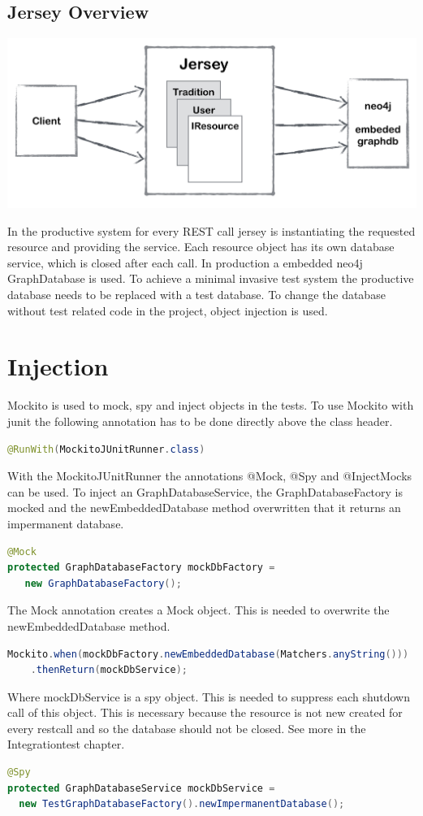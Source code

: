 \documentclass[11pt,fleqn,openany]{book} %
\begin{document}
\section*{Jersey Overview} 

\begin{center}
\includegraphics[scale=.40]{Pictures/jerseyoverview.png} 
\end{center}

In the productive system for every REST call jersey is instantiating the requested resource and providing the service. Each resource object has its own database service, which is closed after each call. In production a embedded neo4j GraphDatabase is used. To achieve a minimal invasive test system the productive database needs to be replaced with a test database. To change the database without test related code in the project, object injection is used. 


\chapter{Injection}
Mockito is used to mock, spy and inject objects in the tests. To use Mockito with junit the following annotation has to be done directly above the class header.
\begin{lstlisting}[language=java]
@RunWith(MockitoJUnitRunner.class)
\end{lstlisting}
With the MockitoJUnitRunner the annotations @Mock, @Spy and @InjectMocks can be used. To inject an GraphDatabaseService, the GraphDatabaseFactory is mocked and the newEmbeddedDatabase method overwritten that it returns an impermanent database. 
\begin{lstlisting}[language=java]
@Mock
protected GraphDatabaseFactory mockDbFactory =
   new GraphDatabaseFactory();
\end{lstlisting}
The Mock annotation creates a Mock object. This is needed to overwrite the newEmbeddedDatabase method.
\begin{lstlisting}[language=java]
Mockito.when(mockDbFactory.newEmbeddedDatabase(Matchers.anyString()))
	.thenReturn(mockDbService);  
\end{lstlisting}
Where mockDbService is a spy object. This is needed to suppress each shutdown call of this object. This is necessary because the resource is not new created for every restcall and so the database should not be closed. See more in the Integrationtest chapter. 
\begin{lstlisting}[language=java]
@Spy
protected GraphDatabaseService mockDbService = 
  new TestGraphDatabaseFactory().newImpermanentDatabase();
\end{lstlisting}
\end{document}
